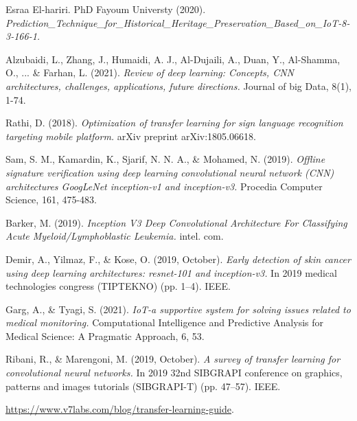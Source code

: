 \begin{thebibliography}{9}
  Esraa El-hariri. PhD Fayoum Universty  (2020). 
  \emph{Prediction\_Technique\_for\_Historical\_Heritage\_Preservation\_Based\_on\_IoT-8-3-166-1.}

  Alzubaidi, L., Zhang, J., Humaidi, A. J., Al-Dujaili, A., Duan, Y., Al-Shamma, O., ... \& Farhan, L. (2021). 
  \emph{Review of deep learning: Concepts, CNN architectures, challenges, applications, future directions.} 
  Journal of big Data, 8(1), 1-74.

  Rathi, D. (2018). 
  \emph{Optimization of transfer learning for sign language recognition targeting mobile platform.} 
  arXiv preprint arXiv:1805.06618.

  Sam, S. M., Kamardin, K., Sjarif, N. N. A., \& Mohamed, N. (2019). 
  \emph{Offline signature verification using deep learning convolutional neural network (CNN) architectures GoogLeNet inception-v1 and inception-v3.} 
  Procedia Computer Science, 161, 475-483.

  Barker, M. (2019). 
  \emph{Inception V3 Deep Convolutional Architecture For Classifying Acute Myeloid/Lymphoblastic Leukemia.} 
  intel. com.

  Demir, A., Yilmaz, F., \& Kose, O. (2019, October). 
  \emph{Early detection of skin cancer using deep learning architectures: resnet-101 and inception-v3.}
  In 2019 medical technologies congress (TIPTEKNO) (pp. 1--4). IEEE.

  Garg, A., \& Tyagi, S. (2021). 
  \emph{IoT-a supportive system for solving issues related to medical monitoring.} 
  Computational Intelligence and Predictive Analysis for Medical Science: A Pragmatic Approach, 6, 53.

  Ribani, R., \& Marengoni, M. (2019, October). 
  \emph{A survey of transfer learning for convolutional neural networks.} 
  In 2019 32nd SIBGRAPI conference on graphics, patterns and images tutorials (SIBGRAPI-T) (pp. 47--57). IEEE.

\url{https://www.v7labs.com/blog/transfer-learning-guide}.


\end{thebibliography}
